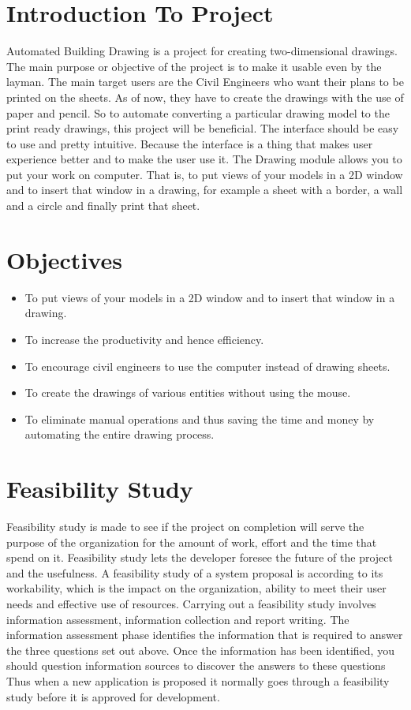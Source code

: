 \section{Introduction To Project} 
\noindent Automated Building Drawing is a project for creating two-dimensional drawings. The main purpose or objective of the project is to make it usable even by the layman. The main target users are the Civil Engineers who want their plans to be printed on the sheets. As of now, they have to create the drawings with the use of paper and pencil. So to automate converting a particular drawing model to the print ready drawings, this project will be beneficial. The interface should be easy
to use and pretty intuitive. Because the interface is a thing that makes user experience better and to make the user use it.
The Drawing module allows you to put your work on computer. That is, to put views of your
models in a 2D window and to insert that window in a drawing, for example a sheet with a border, a wall and a circle and finally print that sheet. 


\section{Objectives}
\begin{itemize}
	\item To put views of your models in a 2D window and to insert that window in a drawing.
	\item To increase the productivity and hence efficiency.
	\item To encourage civil engineers to use the computer instead of drawing sheets.
	\item To create the drawings of various entities without using the mouse.
	\item To eliminate manual operations and thus saving the time and money by automating the entire drawing process.
\end{itemize}



\section{Feasibility Study}
Feasibility study is made to see if the project on completion will serve the purpose of the organization for the amount of work, effort and the time that spend on it. Feasibility study lets the developer foresee the future of the project and the usefulness. A feasibility study of a system proposal is according to its workability, which is the impact on the organization, ability to meet their user needs and effective use of resources. Carrying out a feasibility study involves information assessment, information collection and report writing. The information assessment phase identifies the information that is required to answer the three questions set out above. Once the information has been identified, you should question information sources to discover the answers to these questions Thus when a new application is proposed it normally goes through a feasibility study before it is approved for development.


